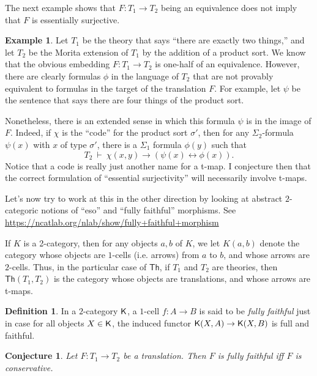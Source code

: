 \documentclass[12pt]{article}
\newtheorem{conj}[prop]{Conjecture}
\theoremstyle{definition}
\newtheorem*{defn}{Definition}
\newtheorem{example}[prop]{Example}
\theoremstyle{remark}
\newcommand{\3}{\mathcal}
\begin{document}
The next example shows that $F:T_1\to T_2$ being an equivalence does
not imply that $F$ is essentially surjective.

\begin{example} Let $T_1$ be the theory that says ``there are exactly
  two things,'' and let $T_2$ be the Morita extension of $T_1$ by the
  addition of a product sort. We know that the obvious embedding
  $F:T_1\to T_2$ is one-half of an equivalence. However, there are
  clearly formulas $\phi$ in the language of $T_2$ that are not
  provably equivalent to formulas in the target of the translation
  $F$. For example, let $\psi$ be the sentence that says there are
  four things of the product sort.

  Nonetheless, there is an extended sense in which this formula $\psi$
  is in the image of $F$. Indeed, if $\chi$ is the ``code'' for the
  product sort $\sigma '$, then for any $\Sigma _2$-formula $\psi (x)$
  with $x$ of type $\sigma '$, there is a $\Sigma _1$ formula
  $\phi (y)$ such that
  \[ T_2\: \vdash \: \chi (x,y)\to (\psi (x)\leftrightarrow \phi (x))
    .\] Notice that a code is really just another name for a t-map. I
  conjecture then that the correct formulation of ``essential
  surjectivity'' will necessarily involve t-maps. \end{example}

Let's now try to work at this in the other direction by looking at
abstract $2$-categoric notions of ``eso'' and ``fully faithful''
morphisms. See
\url{https://ncatlab.org/nlab/show/fully+faithful+morphism}

If $K$ is a 2-category, then for any objects $a,b$ of $K$, we let
$K(a,b)$ denote the category whose objects are $1$-cells (i.e. arrows)
from $a$ to $b$, and whose arrows are $2$-cells. Thus, in the
particular case of $\mathsf{Th}$, if $T_1$ and $T_2$ are theories,
then $\mathsf{Th}(T_1,T_2)$ is the category whose objects are
translations, and whose arrows are t-maps.

\begin{defn} In a $2$-category $\mathsf K$, a $1$-cell $f:A\to B$ is said to
  be \emph{fully faithful} just in case for all objects $X\in \mathsf K$,
  the induced functor $\mathsf K (X,A)\to \mathsf K (X,B)$ is full and
  faithful. \end{defn}

\begin{conj} Let $F:T_1\to T_2$ be a translation. Then $F$ is fully
  faithful iff $F$ is conservative. \end{conj}
\end{document}
